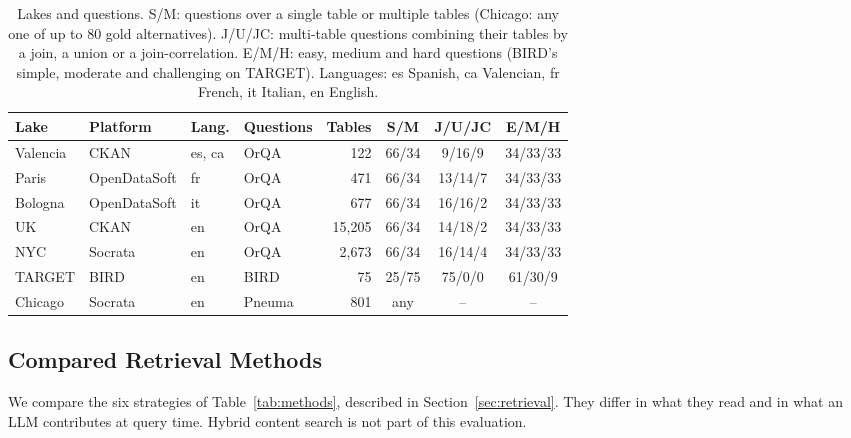 \begin{table}[t]
\caption{Lakes and questions. S/M: questions over a single table or
multiple tables (Chicago: any one of up to 80 gold alternatives). J/U/JC: multi-table questions combining their tables by a join, a
union or a join-correlation. E/M/H: easy, medium and hard questions (BIRD's
simple, moderate and challenging on TARGET). Languages: es Spanish, ca
Valencian, fr French, it Italian, en English.}
\label{tab:datasets}
\centering
\footnotesize
\setlength{\tabcolsep}{3pt}
\begin{tabular}{llllrccc}
\hline
Lake & Platform & Lang. & Questions & Tables & S/M & J/U/JC & E/M/H \\
\hline
Valencia & CKAN & es, ca & OrQA & 122 & 66/34 & 9/16/9 & 34/33/33 \\
Paris & OpenDataSoft & fr & OrQA & 471 & 66/34 & 13/14/7 & 34/33/33 \\
Bologna & OpenDataSoft & it & OrQA & 677 & 66/34 & 16/16/2 & 34/33/33 \\
UK & CKAN & en & OrQA & 15{,}205 & 66/34 & 14/18/2 & 34/33/33 \\
NYC & Socrata & en & OrQA & 2{,}673 & 66/34 & 16/14/4 & 34/33/33 \\
\hline
TARGET & BIRD & en & BIRD & 75 & 25/75 & 75/0/0 & 61/30/9 \\
Chicago & Socrata & en & Pneuma & 801 & any & -- & -- \\
\hline
\end{tabular}
\end{table}

\subsection{Compared Retrieval Methods}
\label{sec:methods}

We compare the six strategies of Table~\ref{tab:methods}, described in
Section~\ref{sec:retrieval}. They differ in what they read and in what an LLM
contributes at query time. Hybrid content search is not part of this
evaluation.

